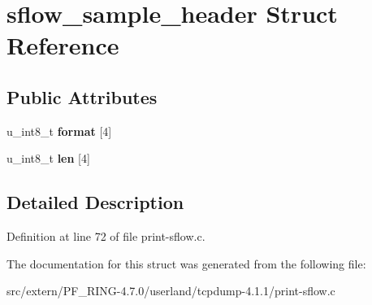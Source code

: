 \hypertarget{structsflow__sample__header}{
\section{sflow\_\-sample\_\-header Struct Reference}
\label{structsflow__sample__header}
}
\subsection*{Public Attributes}
\begin{DoxyCompactItemize}
\item 
\hypertarget{structsflow__sample__header_a1dc0ac1aca7bac1b70445fd4408d2b75}{
u\_\-int8\_\-t {\bfseries format} \mbox{[}4\mbox{]}}
\label{structsflow__sample__header_a1dc0ac1aca7bac1b70445fd4408d2b75}

\item 
\hypertarget{structsflow__sample__header_aeb5faac2c283f02f96f2dd0d9d9e667c}{
u\_\-int8\_\-t {\bfseries len} \mbox{[}4\mbox{]}}
\label{structsflow__sample__header_aeb5faac2c283f02f96f2dd0d9d9e667c}

\end{DoxyCompactItemize}


\subsection{Detailed Description}


Definition at line 72 of file print-\/sflow.c.



The documentation for this struct was generated from the following file:\begin{DoxyCompactItemize}
\item 
src/extern/PF\_\-RING-\/4.7.0/userland/tcpdump-\/4.1.1/print-\/sflow.c\end{DoxyCompactItemize}
